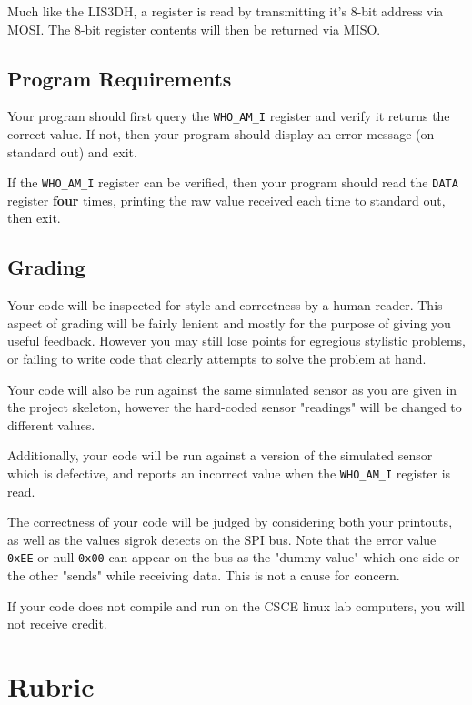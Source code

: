 \documentclass{article}
\begin{document}
Much like the LIS3DH, a register is read by transmitting it's 8-bit address via
MOSI. The 8-bit register contents will then be returned via MISO.

\subsection{Program Requirements}

Your program should first query the \texttt{WHO\_AM\_I} register and verify it
returns the correct value. If not, then your program should display an error
message (on standard out) and exit.

If the \texttt{WHO\_AM\_I} register can be verified, then your program should
read the \texttt{DATA} register \textbf{four} times, printing the raw value
received each time to standard out, then exit.

\subsection{Grading}

Your code will be inspected for style and correctness by a human reader. This
aspect of grading will be fairly lenient and mostly for the purpose of giving
you useful feedback. However you may still lose points for egregious stylistic
problems, or failing to write code that clearly attempts to solve the problem
at hand.

Your code will also be run against the same simulated sensor as you are given
in the project skeleton, however the hard-coded sensor "readings" will be
changed to different values.

Additionally, your code will be run against a version of the simulated sensor
which is defective, and reports an incorrect value when the \texttt{WHO\_AM\_I}
register is read.

The correctness of your code will be judged by considering both your printouts,
as well as the values sigrok detects on the SPI bus. Note that the error value
\texttt{0xEE} or null \texttt{0x00} can appear on the bus as the "dummy value"
which one side or the other "sends" while receiving data. This is not a cause
for concern.

If your code does not compile and run on the CSCE linux lab computers, you will
not receive credit.

\section{Rubric}
\end{document}
